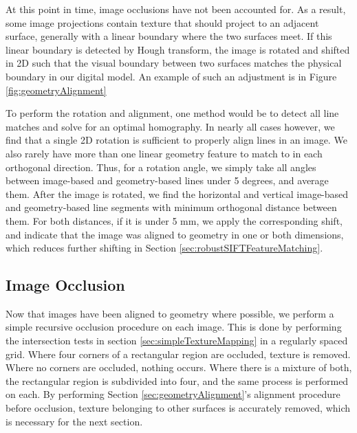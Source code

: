 \documentclass[]{spie}  %
\begin{document}
At this point in time, image occlusions have not been accounted
for. As a result, some image projections contain texture that should
project to an adjacent surface, generally with a linear boundary where
the two surfaces meet. If this linear boundary is detected by Hough
transform, the image is rotated and shifted in 2D such that the visual
boundary between two surfaces matches the physical boundary in our
digital model. An example of such an adjustment is in Figure
\ref{fig:geometryAlignment}

To perform the rotation and alignment, one method would be to detect
all line matches and solve for an optimal homography. In nearly all
cases however, we find that a single 2D rotation is sufficient to
properly align lines in an image. We also rarely have more than one
linear geometry feature to match to in each orthogonal
direction. Thus, for a rotation angle, we simply take all angles
between image-based and geometry-based lines under 5 degrees, and
average them. After the image is rotated, we find the horizontal and
vertical image-based and geometry-based line segments with minimum
orthogonal distance between them. For both distances, if it is under 5
mm, we apply the corresponding shift, and indicate that the image was
aligned to geometry in one or both dimensions, which reduces further
shifting in Section \ref{sec:robustSIFTFeatureMatching}.

\subsection{Image Occlusion}
\label{sec:imageOcclusion}
Now that images have been aligned to geometry where possible, we
perform a simple recursive occlusion procedure on each image. This is
done by performing the intersection tests in section
\ref{sec:simpleTextureMapping} in a regularly spaced grid. Where four
corners of a rectangular region are occluded, texture is
removed. Where no corners are occluded, nothing occurs. Where there is
a mixture of both, the rectangular region is subdivided into four, and
the same process is performed on each. By performing Section
\ref{sec:geometryAlignment}'s alignment procedure before occlusion,
texture belonging to other surfaces is accurately removed, which is
necessary for the next section.
\end{document}
